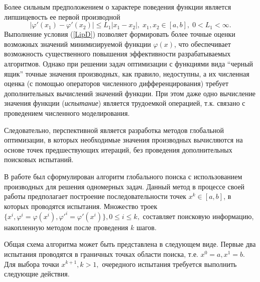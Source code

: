 \documentclass[11pt, oneside, a4paper]{article}
\begin{document}
Более сильным предположением о характере поведения функции является липшицевость ее первой производной 
\begin{equation}\label{LipD}
\left|\varphi'(x_1)-\varphi'(x_2)\right|\leq L_1\left|x_1-x_2\right|,\; x_1,x_2 \in [a,b],\; 0<L_1<\infty.
\end{equation}
Выполнение условия (\ref{LipD}) позволяет формировать более точные оценки возможных значений минимизируемой функции $\varphi(x)$, что обеспечивает возможность существенного повышения эффективности разрабатываемых алгоритмов. 
Однако при решении задач оптимизации с функциями вида ``черный ящик'' точные значения производных, как правило, недоступны, а их численная оценка (с помощью операторов численного дифференцирования) требует дополнительных вычислений значений функции. 
При этом даже одно вычисление значения функции (\textit{испытание}) является трудоемкой операцией, т.к. связано с проведением численного моделирования.   

Следовательно, перспективной является разработка методов глобальной оптимизации, в которых необходимые значения производных вычисляются на основе точек предшествующих итераций, без проведения дополнительных поисковых испытаний.  




В работе \cite{Gergel96} был сформулирован алгоритм глобального поиска с использованием производных для решения одномерных задач. 
Данный метод в процессе своей работы предполагает построение последовательности точек $x^k\in[a,b]$, в которых проводятся испытания. Множество троек $ \{ x^i, \varphi^i=\varphi (x^i), \varphi'^i=\varphi'(x^i)\}, 0 \leq i \leq k,$ составляет поисковую информацию, накопленную методом после проведения $k$ шагов. 

Общая схема алгоритма может быть представлена в следующем виде. Первые два испытания проводятся в граничных точках области поиска, т.е. $x^0 = a, x^1 = b$. Для выбора точки $x^{k+1}, k>1,$ очередного испытания требуется выполнить следующие действия.
\end{document}
